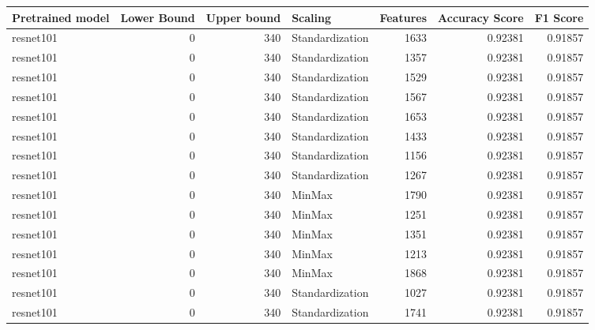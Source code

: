 \begin{tabular}{lrrlrrr}
\hline
 Pretrained model   &   Lower Bound &   Upper bound & Scaling         &   Features &   Accuracy Score &   F1 Score \\
\hline
 resnet101          &             0 &           340 & Standardization &       1633 &          0.92381 &    0.91857 \\
 resnet101          &             0 &           340 & Standardization &       1357 &          0.92381 &    0.91857 \\
 resnet101          &             0 &           340 & Standardization &       1529 &          0.92381 &    0.91857 \\
 resnet101          &             0 &           340 & Standardization &       1567 &          0.92381 &    0.91857 \\
 resnet101          &             0 &           340 & Standardization &       1653 &          0.92381 &    0.91857 \\
 resnet101          &             0 &           340 & Standardization &       1433 &          0.92381 &    0.91857 \\
 resnet101          &             0 &           340 & Standardization &       1156 &          0.92381 &    0.91857 \\
 resnet101          &             0 &           340 & Standardization &       1267 &          0.92381 &    0.91857 \\
 resnet101          &             0 &           340 & MinMax          &       1790 &          0.92381 &    0.91857 \\
 resnet101          &             0 &           340 & MinMax          &       1251 &          0.92381 &    0.91857 \\
 resnet101          &             0 &           340 & MinMax          &       1351 &          0.92381 &    0.91857 \\
 resnet101          &             0 &           340 & MinMax          &       1213 &          0.92381 &    0.91857 \\
 resnet101          &             0 &           340 & MinMax          &       1868 &          0.92381 &    0.91857 \\
 resnet101          &             0 &           340 & Standardization &       1027 &          0.92381 &    0.91857 \\
 resnet101          &             0 &           340 & Standardization &       1741 &          0.92381 &    0.91857 \\

\end{tabular}
